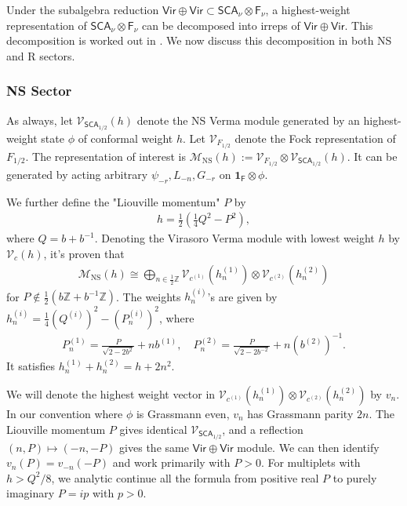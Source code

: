 \documentclass[12pt]{article}
\newcommand{\ie}{\begin{equation}\begin{aligned}}
\newcommand{\fe}{\end{aligned}\end{equation}}
\numberwithin{equation}{section}
\begin{document}
Under the subalgebra reduction $\mathsf{Vir}\oplus \mathsf{Vir}\subset \mathsf{SCA}_\nu \otimes \mathsf{F}_{\nu}$, a highest-weight representation of $\mathsf{SCA}_\nu \otimes \mathsf{F}_{\nu}$ can be decomposed into irreps of $\mathsf{Vir}\oplus \mathsf{Vir}$. This decomposition is worked out in \cite{1608.02568}. We now discuss this decomposition in both NS and R sectors.

\subsubsection*{NS Sector}
As always, let $\mathcal{V}_{\mathsf{SCA}_{1/2}}(h)$ denote the NS Verma
module generated by an  highest-weight state $\phi$ of conformal weight $h$. Let $\mathcal{V}_{F_{1/2}}$ denote the Fock representation of $F_{1/2}$. The representation of interest is $\mathcal{M}_{\mathrm{NS}}(h):=\mathcal{V}_{F_{1/2}}\otimes \mathcal{V}_{\mathsf{SCA}_{1/2}}(h)$.
It can be generated by acting arbitrary $\psi_{-r}, L_{-n}, G_{-r}$ on $\mathbf{1}_{\mathsf{F}}\otimes \phi$. 

We further define the "Liouville momentum" $P$ by
\ie
h=\frac{1}{2}\left(\frac{1}{4}Q^2-P^2\right),
\fe
where $Q=b+b^{-1}$.  Denoting the Virasoro Verma module with lowest weight $h$ by $\mathcal{V}_c(h)$, it's proven that \cite{1111.2803}
\ie \label{NSbranching}
\mathcal{M}_{\mathrm{NS}}(h) \cong \bigoplus_{n \in \frac{1}{2} \mathbb{Z}} \mathcal{V}_{c^{(1)}}(h_{n}^{(1)}) \otimes \mathcal{V}_{c^{(2)}}(h_{n}^{(2)})
\fe
for $P\notin \frac{1}{2}(b\mathbb{Z}+b^{-1}\mathbb{Z})$. The weights $h^{(i)}_{n}$'s are given by $h^{(i)}_n = \frac{1}{4}(Q^{(i)})^2-(P_{n}^{(i)})^2$, where
\ie \label{branchweights}
P_n^{(1)}=\frac{P}{\sqrt{2-2 b^2}}+n b^{(1)},\quad P_n^{(2)}=\frac{P}{\sqrt{2-2 b^{-2}}}+n(b^{(2)})^{-1}.
\fe
It satisfies $h_{n}^{(1)}+h_{n}^{(2)}= h+2n^2$. 

We will denote the highest weight vector in $\mathcal{V}_{c^{(1)}}(h_{n}^{(1)}) \otimes \mathcal{V}_{c^{(2)}}(h_{n}^{(2)})$ by $v_{n}$. In our convention where $\phi$ is Grassmann even, $v_n$ has Grassmann parity $2n$. The Liouville momentum $P$ gives identical $\mathcal{V}_{\mathsf{SCA}_{1/2}}$, and a reflection $(n, P)\mapsto (-n, -P)$ gives the same $\mathsf{Vir}\oplus \mathsf{Vir}$ module. We can then identify $v_n(P)=v_{-n}(-P)$ and work primarily with $P>0$. For multiplets with $h > Q^2/8$, we analytic continue all the formula from positive real $P$ to purely imaginary $P=ip$ with $p>0$. 
\end{document}
